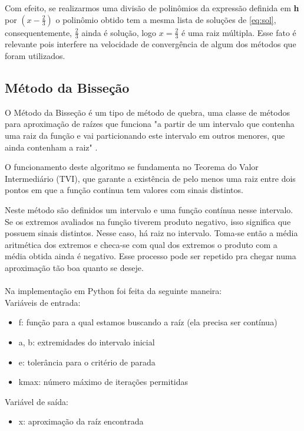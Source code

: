 \documentclass{article}
\begin{document}
Com efeito, se realizarmos uma divisão de polinômios da expressão definida em \textbf{h} por $(x-\frac{2}{3})$ o polinômio obtido tem a mesma lista de soluções de \eqref{eq:sol}, consequentemente, $\frac{2}{3}$ ainda é solução, logo $x=\frac{2}{3}$ é uma raiz múltipla. Esse fato é relevante pois interfere na velocidade de convergência de algum dos métodos que foram utilizados.




\subsection{M\'{e}todo da Bisse\c{c}\~{a}o}
O Método da Bisseção é um tipo de método de quebra, uma classe de métodos para aproximação de raízes que funciona "a partir de um intervalo
que contenha uma raiz da função e vai particionando este intervalo em outros menores, que ainda
contenham a raiz"  \cite{lobao}. 

O funcionamento deste algoritmo se fundamenta no Teorema do Valor Intermediário (TVI), que garante a existência de pelo menos uma raiz entre dois pontos em que a função continua tem valores com sinais distintos. 

Neste método são definidos um intervalo e uma função contínua nesse intervalo. Se os extremos avaliados na função tiverem produto negativo, isso significa que possuem sinais distintos. Nesse caso, há raiz no intervalo. Toma-se então a média aritmética dos extremos e checa-se com qual dos extremos o produto com a média obtida ainda é negativo. Esse processo pode ser repetido pra chegar numa aproximação tão boa quanto se deseje.
\\\\
Na implementação em Python foi feita da seguinte maneira:
\\

Vari\'{a}veis de entrada:
\begin{itemize}
    \item f: fun\c{c}\~{a}o para a qual estamos buscando a ra\'{i}z (ela precisa ser contínua)
    \item a, b: extremidades do intervalo inicial
    \item e: toler\^{a}ncia para o crit\'{e}rio de parada
    \item kmax: n\'{u}mero m\'{a}ximo de itera\c{c}\~{o}es permitidas
\end{itemize}

Vari\'{a}vel de sa\'{i}da:
\begin{itemize}
    \item x: aproxima\c{c}\~{a}o da ra\'{i}z encontrada
\end{itemize}
\end{document}
